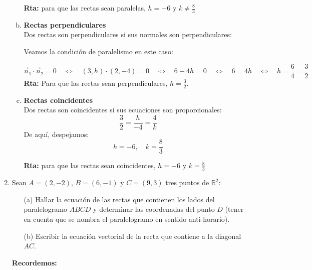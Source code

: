 \documentclass[11pt]{article}
\begin{document}
\begin{enumerate}[\hspace{-5mm} 1) ]
\begin{enumerate}[(a)]
\hfill {\bf Rta:} para que las rectas sean paralelas, $h=-6$ y $ k \neq \frac{8}{3}$

    \item \textbf{Rectas perpendiculares}\\
    Dos rectas son perpendiculares si sus normales son perpendiculares:
   
    
    Veamos la condición de paralelismo en este caso:   

    \[
    \Vec{n}_1\cdot \Vec{n}_2 = 0
    \quad   
    \Longleftrightarrow   
    \quad    
    (3,h) \cdot  (2,-4)= 0
     \quad   
    \Longleftrightarrow   
    \quad    
    6 - 4 h = 0
    \quad   
    \Longleftrightarrow   
    \quad    
    6 = 4 h 
    \quad   
    \Longleftrightarrow   
    \quad    
    h = \frac{6}{4} = \frac{3}{2}
    \]
\hfill {\bf Rta:} Para que las rectas sean perpendiculares, $h  = \tfrac{3}{2}$.
    \item \textbf{Rectas coincidentes}\\
    Dos rectas son coincidentes si sus ecuaciones son proporcionales:
    \begin{equation*}
        \frac{3}{2} = \frac{h}{-4} = \frac{4}{k}
    \end{equation*}
    De aquí, despejamos:
    \begin{equation*}
        h = -6, \quad k = \frac{8}{3}
    \end{equation*}
     
\hfill {\bf Rta:} para que las rectas sean coincidentes, $h=-6$ y $ k = \frac{8}{3}$

\end{enumerate}







\item Sean $A = (2,-2)$, $B = (6,-1)$ y $C = (9,3)$ tres puntos de $\mathbb{R}^2$:

\begin{itemize}
    \item[(a)] Hallar la ecuación de las rectas que contienen los lados del paralelogramo $ABCD$ y determinar las coordenadas del punto $D$ (tener en cuenta que se nombra el paralelogramo en sentido anti-horario).
    \item[(b)] Escribir la ecuación vectorial de la recta que contiene a la diagonal $AC$.
\end{itemize}




\textbf{Recordemos:}



\end{enumerate}
\end{document}
